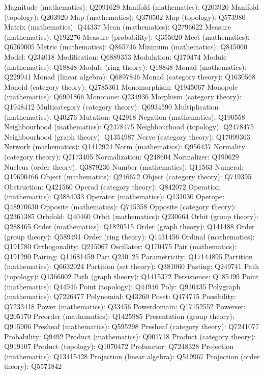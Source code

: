 Magnitude (mathematics): Q2091629
Manifold (mathematics): Q203920
Manifold (topology): Q203920
Map (mathematics): Q370502
Map (topology): Q573980
Matrix (mathematics): Q44337
Mean (mathematics): Q2796622
Measure (mathematics): Q192276
Measure (probability): Q355020
Meet (mathematics): Q6269005
Metric (mathematics): Q865746
Minimum (mathematics): Q845060
Model: Q234018
Modification: Q6889353
Modulation: Q170474
Module (mathematics): Q18848
Module (ring theory): Q18848
Monad (mathematics): Q229941
Monad (linear algebra): Q6897846
Monad (category theory): Q1630568
Monoid (category theory): Q2785361
Monomorphism: Q1945067
Monopole (mathematics): Q6901866
Monotone: Q234936
Morphism (category theory): Q1948412
Multicategory (category theory): Q6934590
Multiplication (mathematics): Q40276
Mutation: Q42918
Negation (mathematics): Q190558
Neighbourhood (mathematics): Q2478475
Neighbourhood (topology): Q2478475
Neighbourhood (graph theory): Q1354987
Nerve (category theory): Q17099363
Network (mathematics): Q1412924
Norm (mathematics): Q956437
Normality (category theory): Q2173405
Normalization: Q248604
Normalizer: Q190629
Nucleus (order theory): Q3879236
Number (mathematics): Q11563
Numeral: Q19690466
Object (mathematics): Q246672
Object (category theory): Q719395
Obstruction: Q421560
Operad (category theory): Q842072
Operation (mathematics): Q3884033
Operator (mathematics): Q131030
Opetope: Q48970630
Opposite (mathematics): Q715358
Opposite (category theory): Q2361385
Orbifold: Q40460
Orbit (mathematics): Q230664
Orbit (group theory): Q288465
Order (mathematics): Q1820515
Order (graph theory): Q141488
Order (group theory): Q589491
Order (ring theory): Q1431456
Ordinal (mathematics): Q191780
Orthogonality: Q215067
Oscillator: Q170475
Pair (mathematics): Q191290
Pairing: Q11681459
Par: Q230125
Parametricity: Q17144895
Partition (mathematics): Q6632024
Partition (set theory): Q381060
Pasting: Q249741
Path (topology): Q1366002
Path (graph theory): Q1415372
Persistence: Q185499
Point (mathematics): Q44946
Point (topology): Q44946
Poly: Q910435
Polygraph (mathematics): Q7226477
Polynomial: Q43260
Poset: Q474715
Possibility: Q7233418
Power (mathematics): Q33456
Powerdomain: Q17152552
Powerset: Q205170
Preorder (mathematics): Q1425985
Presentation (group theory): Q915906
Presheaf (mathematics): Q595298
Presheaf (category theory): Q7241077
Probability: Q9492
Product (mathematics): Q901718
Product (category theory): Q919107
Product (topology): Q1070472
Profunctor: Q7248328
Projection (mathematics): Q13415428
Projection (linear algebra): Q519967
Projection (order theory): Q5571842
